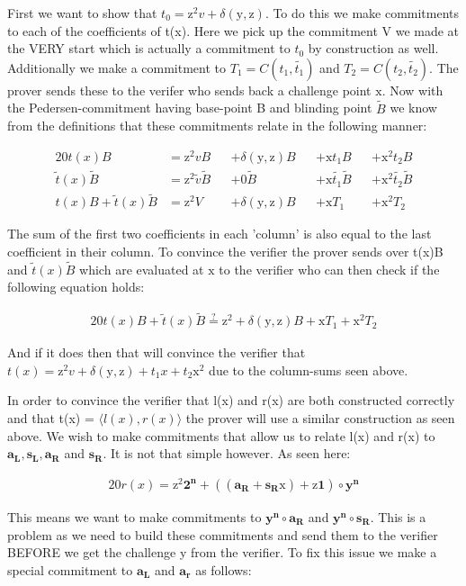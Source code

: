 \documentclass{article}
\newcommand{\eq}[1]{\begin{alignat*}{20}#1\end{alignat*}}
\renewcommand{\vec}[1]{\boldsymbol{#1}}
\newcommand{\ran}[1]{\mathrm{#1}}
\newcommand{\vecran}[1]{\mathbf{#1}}
\newcommand{\dotp}[2]{\langle #1, #2 \rangle}
\begin{document}
First we want to show that $t_0 = \ran{z^2}v + \delta(\ran{y},\ran{z})$. To do this we make commitments to each of the coefficients of t(x). Here we pick up the commitment V we made at the VERY start which is actually a commitment to $t_0$ by construction as well. Additionally we make a commitment to $T_1 = C(t_1, \widetilde{t_1})$ and $T_2 = C(t_2, \widetilde{t_2})$. The prover sends these to the verifer who sends back a challenge point $\ran{x}$. Now with the Pedersen-commitment having base-point B and blinding point $\widetilde{B}$ we know from the definitions that these commitments relate in the following manner:

\eq{
	t(x)B &= \ran{z^2}vB &&+ \delta(\ran{y},\ran{z})B &&+ \ran{x}t_1B &&+ \ran{x^2}t_2B \\
	\widetilde{t}(x)\widetilde{B} &= \ran{z^2}\widetilde{v}\widetilde{B} &&+ 0\widetilde{B} &&+ \ran{x}\widetilde{t_1}\widetilde{B} &&+ \ran{x^2}\widetilde{t_2}\widetilde{B}\\
	t(x)B + \widetilde{t}(x)\widetilde{B} &= \ran{z^2}V &&+ \delta(\ran{y},\ran{z})B &&+ \ran{x}T_1 &&+ \ran{x^2}T_2
}

The sum of the first two coefficients in each 'column' is also equal to the last coefficient in their column. To convince the verifier the prover sends over t(x)B and $\widetilde{t}(x)\widetilde{B}$ which are evaluated at $\ran{x}$ to the verifier who can then check if the following equation holds:

\eq{
	t(x)B + \widetilde{t}(x)\widetilde{B} \stackrel{?}{=} \ran{z^2} + \delta(\ran{y},\ran{z})B + \ran{x}T_1 + \ran{x^2}T_2
}

And if it does then that will convince the verifier that $t(x) = \ran{z^2}v + \delta(\ran{y},\ran{z}) + t_1x + t_2\ran{x^2}$ due to the column-sums seen above.

In order to convince the verifier that l(x) and r(x) are both constructed correctly and that t(x) = $\dotp{l(x)}{r(x)}$ the prover will use a similar construction as seen above. We wish to make commitments that allow us to relate l(x) and r(x) to $\vec{a_L}, \vec{s_L}, \vec{a_R}$ and $\vec{s_R}$. It is not that simple however. As seen here:

\eq{
	r(x) = \ran{z^2}\vec{2^n} + ((\vec{a_R} + \vec{s_R}\ran{x}) + \ran{z}\vec{1})\circ\vecran{y^n}
}

This means we want to make commitments to $\vec{y^n}\circ \vec{a_R}$ and $\vec{y^n}\circ\vec{s_R}$. This is a problem as we need to build these commitments and send them to the verifier BEFORE we get the challenge y from the verifier. To fix this issue we make a special commitment to $\vec{a_L}$ and $\vec{a_r}$ as follows:
\end{document}
